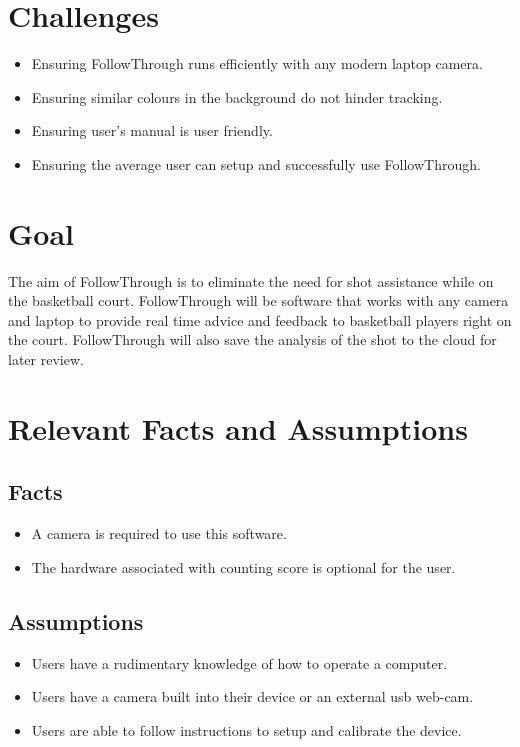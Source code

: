\section{Challenges}
\begin{itemize}
    \item Ensuring FollowThrough runs efficiently with any modern laptop camera.
    \item Ensuring similar colours in the background do not hinder tracking.
    \item Ensuring user's manual is user friendly.
    \item Ensuring the average user can setup and successfully use FollowThrough.
\end{itemize}

\section{Goal}
\hspace*{4mm}The aim of FollowThrough is to eliminate the need for shot assistance while on the basketball court. FollowThrough will be software that works with any camera and laptop to provide real time advice and feedback to basketball players right on the court. FollowThrough will also save the analysis of the shot to the cloud for later review.

\section{Relevant Facts and Assumptions}
\subsection{Facts}
\begin{itemize}
    \item A camera is required to use this software.
    \item The hardware associated with counting score is optional for the user.
\end{itemize}

\subsection{Assumptions}
\begin{itemize}
    \item Users have a rudimentary knowledge of how to operate a computer.
    \item Users have a camera built into their device or an external usb web-cam.
    \item Users are able to follow instructions to setup and calibrate the device.
\end{itemize}

